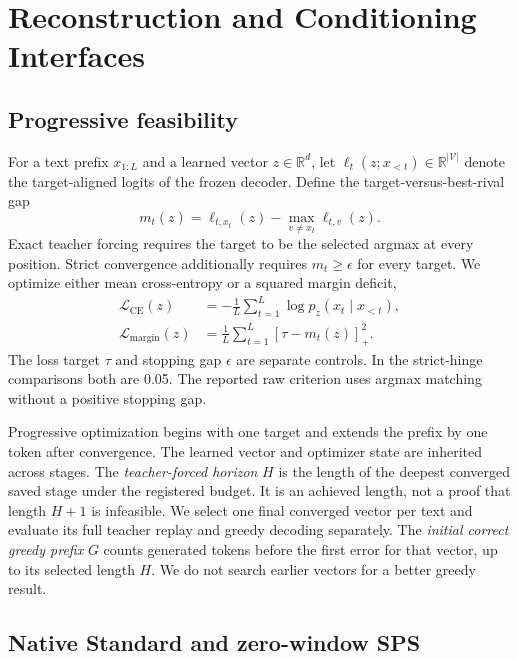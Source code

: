 \documentclass{article}
\newcommand{\R}{\mathbb{R}}
\newcommand{\CE}{\mathcal{L}_{\mathrm{CE}}}
\newcommand{\MH}{\mathcal{L}_{\mathrm{margin}}}
\begin{document}
\section{Reconstruction and Conditioning Interfaces}
\label{sec:method}

\subsection{Progressive feasibility}

For a text prefix $x_{1:L}$ and a learned vector $z\in\R^d$, let
$\ell_t(z;x_{<t})\in\R^{|\mathcal V|}$ denote the target-aligned logits of the frozen decoder.
Define the target-versus-best-rival gap
\begin{equation}
 m_t(z)=\ell_{t,x_t}(z)-\max_{v\ne x_t}\ell_{t,v}(z).
 \label{eq:margin}
\end{equation}
Exact teacher forcing requires the target to be the selected argmax at every position.
Strict convergence additionally requires $m_t\ge\epsilon$ for every target.
We optimize either mean cross-entropy or a squared margin deficit,
\begin{align}
 \CE(z)&=-\frac{1}{L}\sum_{t=1}^{L}\log p_z(x_t\mid x_{<t}),\\
 \MH(z)&=\frac{1}{L}\sum_{t=1}^{L}[\tau-m_t(z)]_+^2.
 \label{eq:objective}
\end{align}
The loss target $\tau$ and stopping gap $\epsilon$ are separate controls.
In the strict-hinge comparisons both are 0.05.
The reported raw criterion uses argmax matching without a positive stopping gap.

Progressive optimization begins with one target and extends the prefix by one token after convergence.
The learned vector and optimizer state are inherited across stages.
The \emph{teacher-forced horizon} $H$ is the length of the deepest converged saved stage under the registered budget.
It is an achieved length, not a proof that length $H+1$ is infeasible.
We select one final converged vector per text and evaluate its full teacher replay and greedy decoding separately.
The \emph{initial correct greedy prefix} $G$ counts generated tokens before the first error for that vector, up to its selected length $H$.
We do not search earlier vectors for a better greedy result.

\subsection{Native Standard and zero-window SPS}
\label{sec:sps}
\end{document}
